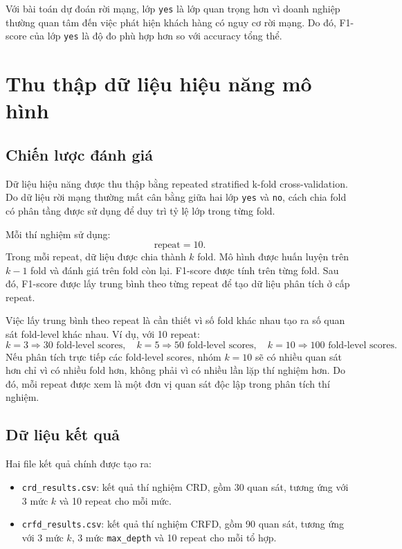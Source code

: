 \documentclass[12pt,a4paper]{article}
\begin{document}
Với bài toán dự đoán rời mạng, lớp \texttt{yes} là lớp quan trọng hơn vì doanh nghiệp thường quan tâm đến việc phát hiện khách hàng có nguy cơ rời mạng. Do đó, F1-score của lớp \texttt{yes} là độ đo phù hợp hơn so với accuracy tổng thể.

\section{Thu thập dữ liệu hiệu năng mô hình}

\subsection{Chiến lược đánh giá}

Dữ liệu hiệu năng được thu thập bằng repeated stratified k-fold cross-validation. Do dữ liệu rời mạng thường mất cân bằng giữa hai lớp \texttt{yes} và \texttt{no}, cách chia fold có phân tầng được sử dụng để duy trì tỷ lệ lớp trong từng fold.

Mỗi thí nghiệm sử dụng:
\[
\text{repeat} = 10.
\]
Trong mỗi repeat, dữ liệu được chia thành $k$ fold. Mô hình được huấn luyện trên $k-1$ fold và đánh giá trên fold còn lại. F1-score được tính trên từng fold. Sau đó, F1-score được lấy trung bình theo từng repeat để tạo dữ liệu phân tích ở cấp repeat.

Việc lấy trung bình theo repeat là cần thiết vì số fold khác nhau tạo ra số quan sát fold-level khác nhau. Ví dụ, với 10 repeat:
\[
k=3 \Rightarrow 30 \text{ fold-level scores}, \quad
k=5 \Rightarrow 50 \text{ fold-level scores}, \quad
k=10 \Rightarrow 100 \text{ fold-level scores}.
\]
Nếu phân tích trực tiếp các fold-level scores, nhóm $k=10$ sẽ có nhiều quan sát hơn chỉ vì có nhiều fold hơn, không phải vì có nhiều lần lặp thí nghiệm hơn. Do đó, mỗi repeat được xem là một đơn vị quan sát độc lập trong phân tích thí nghiệm.

\subsection{Dữ liệu kết quả}

Hai file kết quả chính được tạo ra:
\begin{itemize}
    \item \texttt{crd\_results.csv}: kết quả thí nghiệm CRD, gồm 30 quan sát, tương ứng với 3 mức $k$ và 10 repeat cho mỗi mức.
    \item \texttt{crfd\_results.csv}: kết quả thí nghiệm CRFD, gồm 90 quan sát, tương ứng với 3 mức $k$, 3 mức \texttt{max\_depth} và 10 repeat cho mỗi tổ hợp.
\end{itemize}
\end{document}
